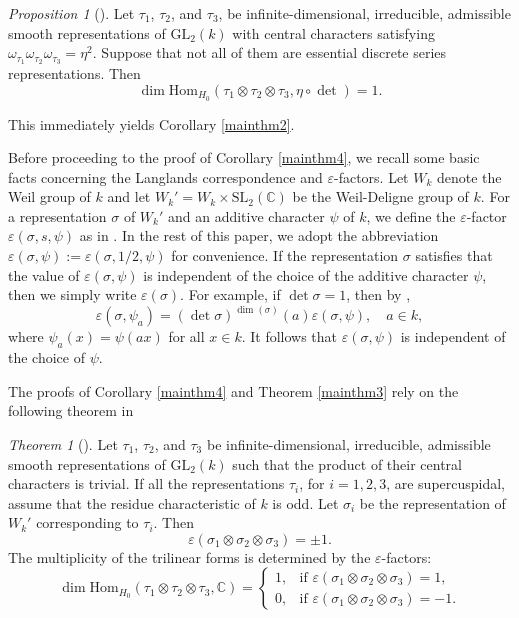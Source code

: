 \documentclass[12pt]{amsart}
\newcommand{\GL}{{\mathrm{GL}}}
\newcommand{\Hom}{{\mathrm{Hom}}}
\newcommand{\SL}{{\mathrm{SL}}}
\theoremstyle{Theorem}
\theoremstyle{Theorem}
\theoremstyle{Theorem}
\theoremstyle{Theorem}
\theoremstyle{Plain}
\theoremstyle{remark}
\theoremstyle{remark}
\theoremstyle{Definition}
\newtheorem{prpd}[dfn]{Proposition}
\newtheorem{thmd}[dfn]{Theorem}
\begin{document}
\begin{prpd}[{\cite[Theorem 1.2]{Prasad}}]
    Let $\tau_1$, $\tau_2$, and $\tau_3$, be infinite-dimensional, irreducible, admissible smooth representations of $\GL_2(k)$ with central characters satisfying $ \omega_{\tau_1} \omega_{\tau_2} \omega_{\tau_3} = \eta^2 $. Suppose that not all of them are essential discrete series representations. Then
    \[
        \dim \Hom_{ H_0 } \left( \tau_1 \otimes \tau_2 \otimes \tau_3, \eta \circ \det \right) = 1.
    \]
\end{prpd}

This immediately yields Corollary \ref{mainthm2}.

Before proceeding to the proof of Corollary \ref{mainthm4}, we recall some basic facts concerning the Langlands correspondence and $\varepsilon$-factors. Let $W_k$ denote the Weil group of $k$ and let $ W_k' = W_k \times \SL_2 ( \mathbb{C} ) $ be the Weil-Deligne group of $k$. For a representation $\sigma$ of $W_k'$ and an additive character $\psi$ of $k$, we define the $\varepsilon$-factor $ \varepsilon( \sigma, s, \psi ) $ as in \cite{Tate}. In the rest of this paper, we adopt the abbreviation $\varepsilon( \sigma, \psi ) := \varepsilon( \sigma, 1/2, \psi ) $ for convenience. If the representation $\sigma$ satisfies that the value of $ \varepsilon( \sigma, \psi ) $ is independent of the choice of the additive character $\psi$, then we simply write $ \varepsilon( \sigma ) $. For example, if $ \det \sigma = 1 $, then by \cite[8.1.5]{Prasad},
\[
    \varepsilon( \sigma, \psi_a ) = ( \det \sigma )^{ \dim ( \sigma ) }( a ) \varepsilon( \sigma, \psi ), \quad a \in k,
\]
where $ \psi_a ( x ) = \psi( ax ) $ for all $ x \in k $. It follows that $ \varepsilon( \sigma, \psi ) $ is independent of the choice of $\psi$.

The proofs of Corollary \ref{mainthm4} and Theorem \ref{mainthm3} rely on the following theorem in \cite{Prasad} 

\begin{thmd}[{\cite[Theorem 1.4]{Prasad}}]
    \label{thm1.4}
    Let $\tau_1$, $\tau_2$, and $\tau_3$ be infinite-dimensional, irreducible, admissible smooth representations of $\GL_2(k)$ such that the product of their central characters is trivial. If all the representations $\tau_i$, for $ i = 1, 2, 3 $, are supercuspidal, assume that the residue characteristic of $k$ is odd. Let $\sigma_i$ be the representation of $W_k'$ corresponding to $\tau_i$. Then    
    \[
        \varepsilon( \sigma_1 \otimes \sigma_2 \otimes \sigma_3 ) = \pm1.
    \]
    The multiplicity of the trilinear forms is determined by the $\varepsilon$-factors:
    \[
        \dim \Hom_{ H_0 } \left( \tau_1 \otimes \tau_2 \otimes \tau_3, \mathbb{C} \right) =
        \begin{cases}
            1, & \text{if } \varepsilon( \sigma_1 \otimes \sigma_2 \otimes \sigma_3 ) = 1, \\
            0, & \text{if } \varepsilon( \sigma_1 \otimes \sigma_2 \otimes \sigma_3 ) = -1.
        \end{cases}
    \]   
\end{thmd}
\end{document}
